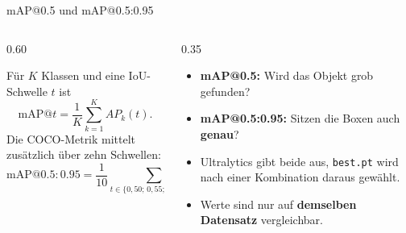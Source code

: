 \begin{frame}{mAP@0.5 und mAP@0.5:0.95}
\footnotesize
{}
\begin{columns}
\begin{column}{0.60\textwidth}
\begin{definition}
Für $K$ Klassen und eine IoU-Schwelle $t$ ist
\[
\text{mAP}@t = \frac{1}{K} \sum_{k=1}^{K} AP_k(t).
\]
Die COCO-Metrik mittelt zusätzlich über zehn Schwellen:
\[
\text{mAP}@0.5{:}0.95 = \frac{1}{10} \sum_{t \in \{0{,}50;\, 0{,}55;\, \dots;\, 0{,}95\}} \text{mAP}@t
\]
\end{definition}
\end{column}
\begin{column}{0.35\textwidth}
\begin{itemize}
  \item \textbf{mAP@0.5:} Wird das Objekt grob gefunden?
  \item \textbf{mAP@0.5:0.95:} Sitzen die Boxen auch \textbf{genau}?
  \item Ultralytics gibt beide aus, \texttt{best.pt} wird nach einer Kombination daraus gewählt.
  \item Werte sind nur auf \textbf{demselben Datensatz} vergleichbar.
\end{itemize}
\end{column}
\end{columns}
\end{frame}

